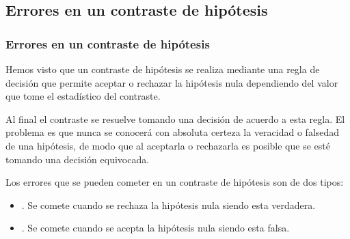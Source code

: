 \subsection{Errores en un contraste de hipótesis}
\begin{frame}
\frametitle{Errores en un contraste de hipótesis}
Hemos visto que un contraste de hipótesis se realiza mediante una regla de decisión que permite aceptar o rechazar la
hipótesis nula dependiendo del valor que tome el estadístico del contraste. 

Al final el contraste se resuelve tomando una decisión de acuerdo a esta regla.
El problema es que nunca se conocerá con absoluta certeza la veracidad o falsedad de una hipótesis, de modo
que al aceptarla o rechazarla es posible que se esté tomando una decisión equivocada.

Los errores que se pueden cometer en un contraste de hipótesis son de dos tipos:
\begin{itemize}
\item {}. Se comete cuando se rechaza la hipótesis nula siendo esta verdadera.
\item {}. Se comete cuando se acepta la hipótesis nula siendo esta falsa.
\end{itemize}
\end{frame}


